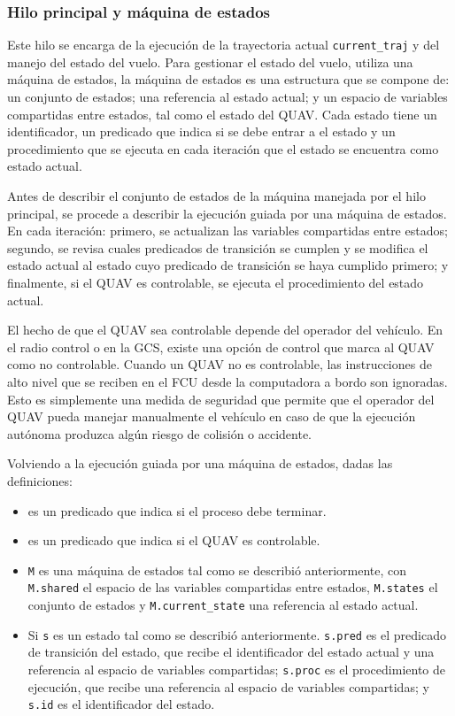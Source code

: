 \subsubsection*{Hilo principal y máquina de estados}

Este hilo se encarga de la ejecución de la trayectoria actual \texttt{current\_traj} y del manejo del estado del vuelo. Para gestionar el estado del vuelo, utiliza una máquina de estados, la máquina de estados es una estructura que se compone de: un conjunto de estados; una referencia al estado actual; y un espacio de variables compartidas entre estados, tal como el estado del QUAV. Cada estado tiene un identificador, un predicado que indica si se debe entrar a el estado y un procedimiento que se ejecuta en cada iteración que el estado se encuentra como estado actual.

Antes de describir el conjunto de estados de la máquina manejada por el hilo principal, se procede a describir la ejecución guiada por una máquina de estados. En cada iteración: primero, se actualizan las variables compartidas entre estados; segundo, se revisa cuales predicados de transición se cumplen y se modifica el estado actual al estado cuyo predicado de transición se haya cumplido primero; y finalmente, si el QUAV es controlable, se ejecuta el procedimiento del estado actual. 

El hecho de que el QUAV sea controlable depende del operador del vehículo. En el radio control o en la GCS, existe una opción de control que marca al QUAV como no controlable. Cuando un QUAV no es controlable, las instrucciones de alto nivel que se reciben en el FCU desde la computadora a bordo son ignoradas. Esto es simplemente una medida de seguridad que permite que el operador del QUAV pueda manejar manualmente el vehículo en caso de que la ejecución autónoma produzca algún riesgo de colisión o accidente.

Volviendo a la ejecución guiada por una máquina de estados, dadas las definiciones:

\begin{itemize}
    \item {} es un predicado que indica si el proceso debe terminar.
    \item {} es un predicado que indica si el QUAV es controlable.
    \item \texttt{M} es una máquina de estados tal como se describió anteriormente, con \texttt{M.shared} el espacio de las variables compartidas entre estados, \texttt{M.states} el conjunto de estados y \texttt{M.current\_state} una referencia al estado actual.
    \item Si \texttt{s} es un estado tal como se describió anteriormente. \texttt{s.pred} es el predicado de transición del estado, que recibe el identificador del estado actual y una referencia al espacio de variables compartidas; \texttt{s.proc} es el procedimiento de ejecución, que recibe una referencia al espacio de variables compartidas; y \texttt{s.id} es el identificador del estado.
\end{itemize}

